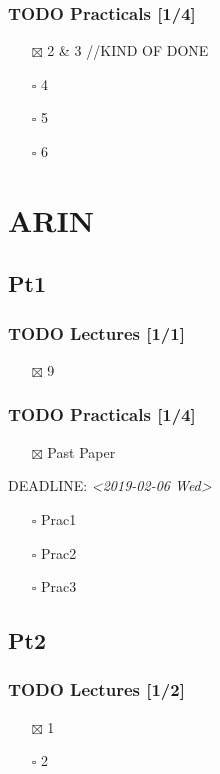 \documentclass[11pt]{article}
\begin{document}
\subsubsection{{\bfseries\sffamily TODO} Practicals [1/4]}
\label{sec:orga19a443}
\begin{itemize}
\item[{$\boxtimes$}] 2 \& 3 //KIND OF DONE
\item[{$\square$}] 4
\item[{$\square$}] 5
\item[{$\square$}] 6
\end{itemize}
\section{ARIN}
\label{sec:org2dd7362}
\subsection{Pt1}
\label{sec:org2e562d9}
\subsubsection{{\bfseries\sffamily TODO} Lectures [1/1]}
\label{sec:orge0356c7}
\begin{itemize}
\item[{$\boxtimes$}] 9
\end{itemize}
\subsubsection{{\bfseries\sffamily TODO} Practicals [1/4]}
\label{sec:org39da8a1}
\begin{itemize}
\item[{$\boxtimes$}] Past Paper
\end{itemize}
DEADLINE: \textit{<2019-02-06 Wed>}
\begin{itemize}
\item[{$\square$}] Prac1
\item[{$\square$}] Prac2
\item[{$\square$}] Prac3
\end{itemize}
\subsection{Pt2}
\label{sec:orga4f2584}
\subsubsection{{\bfseries\sffamily TODO} Lectures [1/2]}
\label{sec:org044750b}
\begin{itemize}
\item[{$\boxtimes$}] 1
\item[{$\square$}] 2
\end{itemize}
\end{document}
